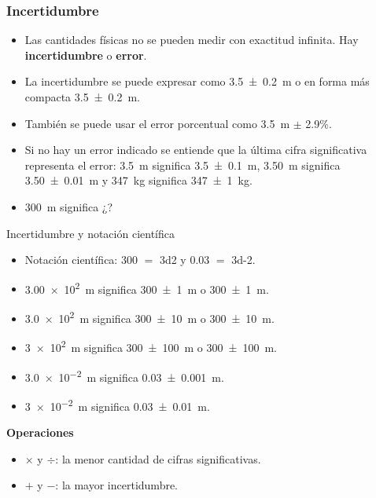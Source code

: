 \documentclass[9pt, aspectratio=169]{beamer}
\begin{document}
\begin{frame}
  \frametitle{Incertidumbre}
\Large
\begin{itemize}
 \item Las cantidades físicas no se pueden medir con exactitud infinita. Hay {\bf incertidumbre} o {\bf error}.
 \item La incertidumbre se puede expresar como \qty[separate-uncertainty=true]{3.5 \pm 0.2}{m} o en forma más compacta \qty{3.5 \pm 0.2}{m}.
 \item También se puede usar el error porcentual como \qty{3.5}{m} $\pm$  \num{2.9}\%. 
 \item Si no hay un error indicado se entiende que la última cifra significativa representa el error: \qty{3.5}{m} significa \qty{3.5 \pm 0.1}{m}, \qty{3.50}{m} significa \qty{3.50 \pm 0.01}{m} y \qty{347}{kg} significa \qty{347 \pm 1}{kg}.    
 \item \qty{300}{m} significa ¿?
\end{itemize}
\end{frame}

\begin{frame}{Incertidumbre y notación científica}
\Large
\begin{itemize}
    \item Notación científica: \num{300} $=$ \num{3d2} y \num{0.03} $=$ \num{3d-2}.
    \item \qty{3.00e2}{m} significa \qty[separate-uncertainty=true]{300 \pm 1}{m} o \qty{300 \pm 1}{m}. 
    \item \qty{3.0e2}{m} significa \qty[separate-uncertainty=true]{300 \pm 10}{m} o \qty{300 \pm 10}{m}.
    \item \qty{3e2}{m} significa \qty[separate-uncertainty=true]{300 \pm 100}{m} o \qty{300 \pm 100}{m}.
    \item \qty{3.0e-2}{m} significa \qty[separate-uncertainty=true]{0.03 \pm 0.001}{m}.
    \item \qty{3e-2}{m} significa \qty[separate-uncertainty=true]{0.03 \pm 0.01}{m}.
\end{itemize}

\vspace{0.2cm}
{\bf Operaciones}
\begin{itemize}
 \item $\times$ y $\div$: la menor cantidad de cifras significativas.
 \item $+$ y $-$: la mayor incertidumbre.
\end{itemize}
\end{frame}
\end{document}
